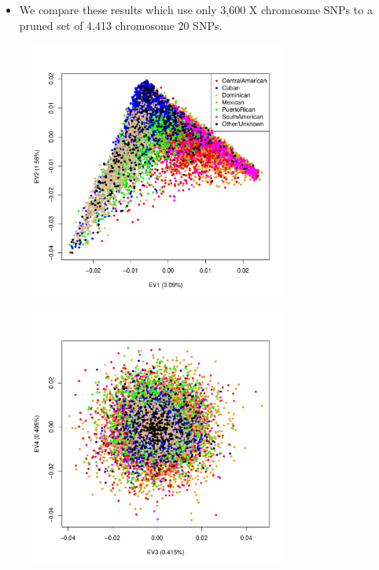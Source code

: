 \documentclass{beamer}
\begin{document}
\begin{frame}
\begin{itemize}
\item We compare these results which use only 3,600 X chromosome SNPs to a pruned set of 4,413 chromosome 20 SNPs.
\end{itemize}
\end{frame}


\begin{frame}
\centering
\begin{figure}
\includegraphics[height=8.5cm]{../pca_chr20_ev12_col.pdf}
\end{figure}
\end{frame}

\begin{frame}
\centering
\begin{figure}
\includegraphics[height=8.5cm]{../pca_chr20_ev34_col.pdf}
\end{figure}
\end{frame}
\end{document}
